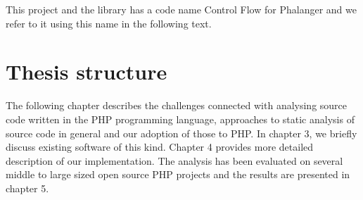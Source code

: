     This project and the library has a code name Control Flow for Phalanger 
    and we refer to it using this name in the following text.
    
    \section{Thesis structure}
    
    The following chapter describes the challenges connected with analysing source code 
    written in the PHP programming language, approaches to static analysis of 
    source code in general and our adoption of those to PHP. 
    In chapter 3, we briefly discuss existing software of 
    this kind. Chapter 4 provides more detailed description of our implementation. 
    The analysis has been evaluated on several middle to large sized open source 
    PHP projects and the results are presented in chapter 5.
    